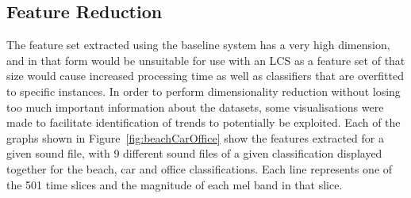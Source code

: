 \documentclass[11pt]{article}
\begin{document}
\subsection{Feature Reduction}
\label{sec:featReduce}

The feature set extracted using the baseline system has a very high dimension, and in that form would be unsuitable for use with an LCS as a feature set of that size would cause increased processing time as well as classifiers that are overfitted to specific instances. In order to perform dimensionality reduction without losing too much important information about the datasets, some visualisations were made to facilitate identification of trends to potentially be exploited. Each of the graphs shown in Figure~\ref{fig:beachCarOffice} show the features extracted for a given sound file, with 9 different sound files of a given classification displayed together for the beach, car and office classifications. Each line represents one of the 501 time slices and the magnitude of each mel band in that slice. 
\end{document}
